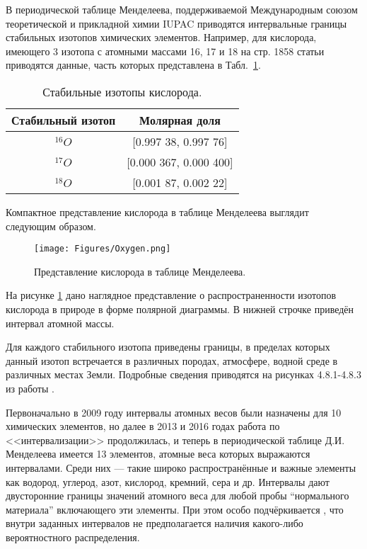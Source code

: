\documentclass[a5paper,openany]{book}
\begin{document}
В периодической таблице Менделеева, поддерживаемой Международным союзом теоретической 
и прикладной химии IUPAC приводятся интервальные границы стабильных изотопов химических 
элементов. Например, для кислорода, имеющего 3 изотопа с атомными массами 16, 17 и 18 
на стр. 1858 статьи \cite{IUPAC} приводятся данные, часть которых представлена 
в Табл.~\ref{IUPACOxygen}. 

\begin{table}[h!]
	\centering
	\caption{Стабильные изотопы кислорода.} 
	\medskip 
	\begin{tabular}{|c|c|}
		\hline
		Стабильный  изотоп & Молярная доля \\
		\hline 
		$^{16}O$ & [0.997 38, 0.997 76] \\
		$^{17}O$ & [0.000 367, 0.000 400] \\
		$^{18}O$ & [0.001 87, 0.002 22] \\			
		\hline
	\end{tabular}
	\label{IUPACOxygen}
\end{table} 


Компактное представление кислорода в таблице Менделеева выглядит следующим образом.

\begin{figure}[ht] 
	\centering\small
	\texttt{[image: Figures/Oxygen.png]}
	\caption{Представление кислорода в таблице Менделеева.} 
	\label{f:Oxygen}
\end{figure}	
На рисунке \ref{f:Oxygen} дано наглядное представление о распространенности изотопов кислорода в природе в форме полярной диаграммы. В нижней строчке приведён интервал атомной массы.

Для каждого стабильного изотопа приведены границы, в пределах которых данный изотоп 
встречается в различных породах, атмосфере, водной среде в различных местах Земли. 
Подробные сведения приводятся на рисунках 4.8.1-4.8.3 из работы \cite{IUPAC}. 


Первоначально в 2009 году интервалы атомных весов были назначены для 10 химических 
элементов, но далее в 2013 и 2016 годах работа по <<интервализации>> продолжилась, 
и теперь в периодической таблице Д.И.\,Менделеева имеется 13 элементов, атомные веса 
которых выражаются интервалами. Среди них --- такие широко распространённые и важные 
элементы как водород, углерод, азот, кислород, кремний, сера и др. Интервалы дают 
двусторонние границы значений атомного веса для любой пробы ``нормального материала'' 
включающего эти элементы. При этом особо подчёркивается \cite{IUPAC}, что внутри 
заданных интервалов не предполагается наличия какого-либо вероятностного распределения. 
\end{document}
